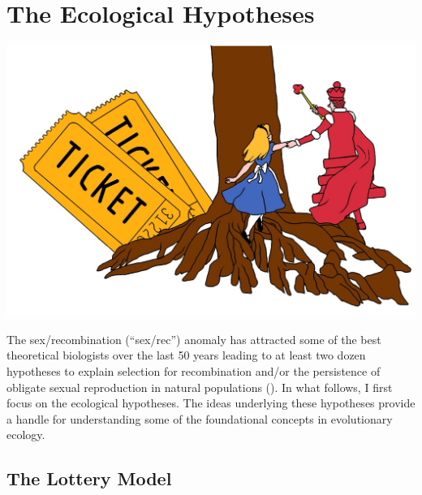 \documentclass[
  letterpaper,
]{book}
\begin{document}

\chapter{The Ecological Hypotheses}\label{sec-eco-hyp}

\begin{center}
\includegraphics{images/fig2-1.jpeg}
\end{center}

The sex/recombination (``sex/rec'') anomaly has attracted some of the
best theoretical biologists over the last 50 years leading to at least
two dozen hypotheses to explain selection for recombination and/or the
persistence of obligate sexual reproduction in natural populations
(). In what follows, I
first focus on the ecological hypotheses. The ideas underlying these
hypotheses provide a handle for understanding some of the foundational
concepts in evolutionary ecology.

\section{The Lottery Model}\label{the-lottery-model}
\end{document}
